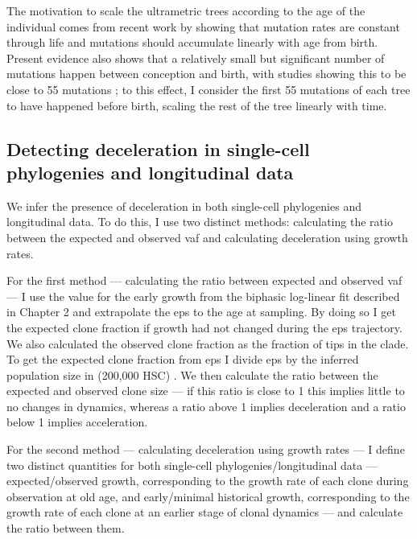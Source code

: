 The motivation to scale the ultrametric trees according to the age of the individual comes from recent work by  showing that mutation rates are constant through life \cite{Abascal_2021_gjvqfm} and mutations should accumulate linearly with age from birth. Present evidence also shows that a relatively small but significant number of mutations happen between conception and birth, with studies showing this to be close to 55 mutations \cite{SpencerChapman_2021_gjz4x4,Mitchell2021-zl}; to this effect, I consider the first 55 mutations of each tree to have happened before birth, scaling the rest of the tree linearly with time.

\subsection{Detecting deceleration in single-cell phylogenies and longitudinal data}

We infer the presence of deceleration in both single-cell phylogenies and longitudinal data. To do this, I use two distinct methods: calculating the ratio between the expected and observed \ac{vaf} and calculating deceleration using growth rates. 

For the first method --- calculating the ratio between expected and observed \ac{vaf} --- I use the value for the early growth from the biphasic log-linear fit described in Chapter 2 and extrapolate the \ac{eps} to the age at sampling. By doing so I get the expected clone fraction if growth had not changed during the \ac{eps} trajectory. We also calculated the observed clone fraction as the fraction of tips in the clade. To get the expected clone fraction from \ac{eps} I divide \ac{eps} by the inferred population size in  (200,000 HSC) \cite{Lee-Six2018-lp}. We then calculate the ratio between the expected and observed clone size --- if this ratio is close to 1 this implies little to no changes in dynamics, whereas a ratio above 1 implies deceleration and a ratio below 1 implies acceleration.

For the second method --- calculating deceleration using growth rates --- I define two distinct quantities for both single-cell phylogenies/longitudinal data --- expected/observed growth, corresponding to the growth rate of each clone during observation at old age, and early/minimal historical growth, corresponding to the growth rate of each clone at an earlier stage of clonal dynamics --- and calculate the ratio between them.

